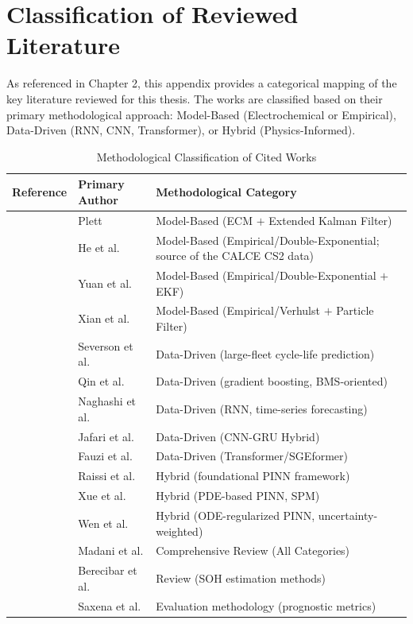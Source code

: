 \chapter{Classification of Reviewed Literature}
\label{app:lit-classification}

As referenced in Chapter 2, this appendix provides a categorical mapping of the key literature reviewed for this thesis. The works are classified based on their primary methodological approach: Model-Based (Electrochemical or Empirical), Data-Driven (RNN, CNN, Transformer), or Hybrid (Physics-Informed).

\begin{table}[h!]
\centering
\renewcommand{\arraystretch}{1.3}
\begin{tabularx}{\textwidth}{@{} l l X @{}}
\toprule
\textbf{Reference} & \textbf{Primary Author} & \textbf{Methodological Category} \\
\midrule

\cite{plett_ekf} & Plett & Model-Based (ECM $+$ Extended Kalman Filter) \\
\cite{he_calce} & He et al. & Model-Based (Empirical/Double-Exponential; source of the CALCE CS2 data) \\
\cite{ma_dual_exp} & Yuan et al. & Model-Based (Empirical/Double-Exponential $+$ EKF) \\
\cite{verhulst_pso} & Xian et al. & Model-Based (Empirical/Verhulst $+$ Particle Filter) \\

\cite{severson_data} & Severson et al. & Data-Driven (large-fleet cycle-life prediction) \\
\cite{naseri_efficient} & Qin et al. & Data-Driven (gradient boosting, BMS-oriented) \\
\cite{zhang_rnn} & Naghashi et al. & Data-Driven (RNN, time-series forecasting) \\
\cite{jafari_cnn_gru} & Jafari et al. & Data-Driven (CNN-GRU Hybrid) \\
\cite{fauzi_sge} & Fauzi et al. & Data-Driven (Transformer/SGEformer) \\

\cite{raissi_pinn} & Raissi et al. & Hybrid (foundational PINN framework) \\
\cite{wang_pinn} & Xue et al. & Hybrid (PDE-based PINN, SPM) \\
\cite{pde_pinn} & Wen et al. & Hybrid (ODE-regularized PINN, uncertainty-weighted) \\
\cite{ref1_general} & Madani et al. & Comprehensive Review (All Categories) \\
\cite{berecibar_review} & Berecibar et al. & Review (SOH estimation methods) \\
\cite{saxena_metrics} & Saxena et al. & Evaluation methodology (prognostic metrics) \\

\bottomrule
\end{tabularx}
\caption{Methodological Classification of Cited Works}
\label{tab:lit_class}
\end{table}

